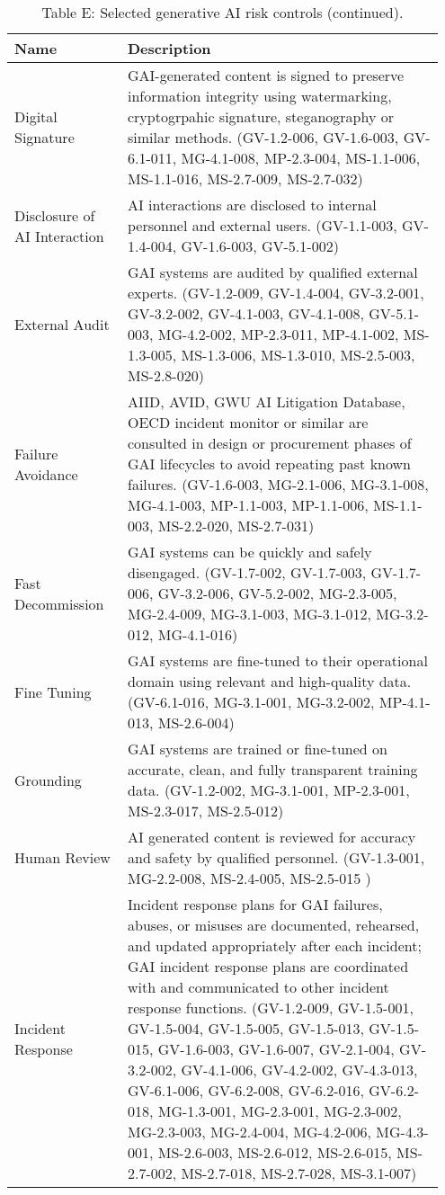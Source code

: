\documentclass[fleqn]{article}
\begin{document}
\begin{table}[H]
	\caption*{Table E: Selected generative AI risk controls (continued).}
	\label{tab:controls_cont}
	\footnotesize
	\begin{tabular}{|m{0.25\linewidth} |m{0.70\linewidth} |}
		\hline
		\textbf{Name} & \textbf{Description} \\
		\hline		
		Digital Signature & GAI-generated content is signed to preserve information integrity using watermarking, cryptogrpahic signature, steganography or similar methods. (GV-1.2-006, GV-1.6-003, GV-6.1-011, MG-4.1-008, MP-2.3-004, MS-1.1-006, MS-1.1-016, MS-2.7-009, MS-2.7-032) \\ \hline
		Disclosure of AI Interaction & AI interactions are disclosed to internal personnel and external users. (GV-1.1-003, GV-1.4-004, GV-1.6-003, GV-5.1-002) \\ \hline
		External Audit & GAI systems are audited by qualified external experts. (GV-1.2-009, GV-1.4-004, GV-3.2-001, GV-3.2-002, GV-4.1-003, GV-4.1-008, GV-5.1-003, MG-4.2-002, MP-2.3-011, MP-4.1-002, MS-1.3-005, MS-1.3-006, MS-1.3-010, MS-2.5-003, MS-2.8-020) \\ \hline
		Failure Avoidance & AIID, AVID, GWU AI Litigation Database, OECD incident monitor or similar are consulted in design or procurement phases of GAI lifecycles to avoid repeating past known failures. (GV-1.6-003, MG-2.1-006, MG-3.1-008, MG-4.1-003, MP-1.1-003, MP-1.1-006, MS-1.1-003, MS-2.2-020, MS-2.7-031) \\ \hline
		Fast Decommission & GAI systems can be quickly and safely disengaged. (GV-1.7-002, GV-1.7-003, GV-1.7-006, GV-3.2-006, GV-5.2-002, MG-2.3-005, MG-2.4-009, MG-3.1-003, MG-3.1-012, MG-3.2-012, MG-4.1-016) \\ \hline		
		Fine Tuning & GAI systems are fine-tuned to their operational domain using relevant and high-quality data. (GV-6.1-016, 	MG-3.1-001, MG-3.2-002, MP-4.1-013, MS-2.6-004) \\ \hline
		Grounding & GAI systems are trained or fine-tuned on accurate, clean, and fully transparent training data. (GV-1.2-002, MG-3.1-001, MP-2.3-001, MS-2.3-017, MS-2.5-012) \\ \hline
		Human Review  & AI generated content is reviewed for accuracy and safety by qualified personnel. (GV-1.3-001, MG-2.2-008, MS-2.4-005, MS-2.5-015 ) \\ \hline
		Incident Response & Incident response plans for GAI failures, abuses, or misuses are documented, rehearsed, and updated appropriately after each incident; GAI incident response plans are coordinated with and communicated to other incident response functions. (GV-1.2-009, GV-1.5-001, GV-1.5-004, GV-1.5-005, GV-1.5-013, GV-1.5-015, GV-1.6-003, GV-1.6-007, GV-2.1-004, GV-3.2-002, GV-4.1-006, GV-4.2-002, GV-4.3-013, GV-6.1-006, GV-6.2-008, GV-6.2-016, GV-6.2-018, MG-1.3-001, MG-2.3-001, MG-2.3-002, MG-2.3-003, MG-2.4-004, MG-4.2-006, MG-4.3-001, MS-2.6-003, MS-2.6-012, MS-2.6-015, MS-2.7-002, MS-2.7-018, MS-2.7-028, MS-3.1-007) \\ \hline

\end{tabular}
\end{table}
\end{document}
